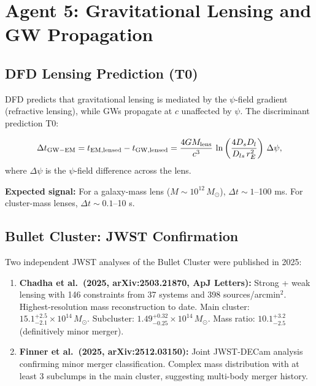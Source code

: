\documentclass[11pt]{article}
\newcommand{\ee}[1]{\times 10^{#1}}
\begin{document}
\section{Agent 5: Gravitational Lensing and GW Propagation}

\subsection{DFD Lensing Prediction (T0)}

DFD predicts that gravitational lensing is mediated by the $\psi$-field
gradient (refractive lensing), while GWs propagate at $c$ unaffected
by $\psi$. The discriminant prediction T0:

\begin{equation}
  \Delta t_{\rm GW-EM} = t_{\rm EM,lensed} - t_{\rm GW,lensed}
  = \frac{4GM_{\rm lens}}{c^3}\,\ln\left(\frac{4D_s D_l}{D_{ls}\,r_E^2}
  \right)\,\Delta\psi,
\end{equation}
where $\Delta\psi$ is the $\psi$-field difference across the lens.

\textbf{Expected signal:} For a galaxy-mass lens ($M \sim 10^{12}\,M_\odot$),
$\Delta t \sim 1$--100 ms. For cluster-mass lenses, $\Delta t \sim 0.1$--10 s.

\subsection{Bullet Cluster: JWST Confirmation}

Two independent JWST analyses of the Bullet Cluster were published
in 2025:

\begin{enumerate}
  \item \textbf{Chadha et al.\ (2025, arXiv:2503.21870, ApJ Letters):}
    Strong + weak lensing with 146 constraints from 37 systems and
    398 sources/arcmin$^2$. Highest-resolution mass reconstruction
    to date. Main cluster: $15.1^{+2.5}_{-2.1} \ee{14}\,M_\odot$.
    Subcluster: $1.49^{+0.32}_{-0.25} \ee{14}\,M_\odot$.
    Mass ratio: $10.1^{+3.2}_{-2.5}$ (definitively minor merger).

  \item \textbf{Finner et al.\ (2025, arXiv:2512.03150):}
    Joint JWST-DECam analysis confirming minor merger classification.
    Complex mass distribution with at least 3 subclumps in the main
    cluster, suggesting multi-body merger history.
\end{enumerate}
\end{document}
